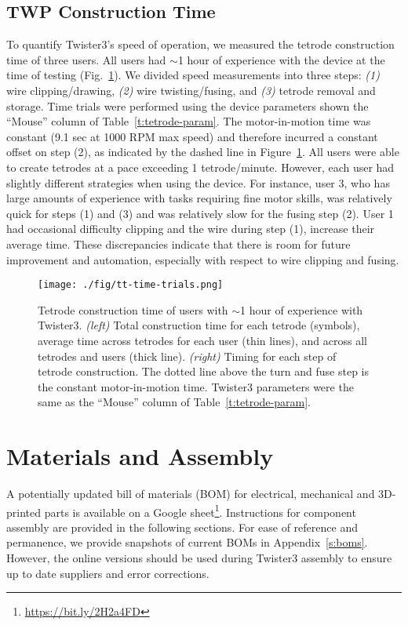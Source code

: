\documentclass[11pt,a4paper]{article}
\begin{document}
\subsection{TWP Construction Time}
To quantify Twister3's speed of operation, we measured the tetrode construction
time of three users. All users had $\sim$1 hour of experience with the device
at the time of testing (Fig.~\ref{f:tt-time}). We divided speed measurements
into three steps: \textit{(1)} wire clipping/drawing, \textit{(2)} wire
twisting/fusing, and \textit{(3)} tetrode removal and storage.  Time trials
were performed using the device parameters shown the ``Mouse'' column of
Table~\ref{t:tetrode-param}. The motor-in-motion time was constant (9.1 sec at
1000 RPM max speed) and therefore incurred a constant offset on step (2), as
indicated by the dashed line in Figure~\ref{f:tt-time}. All users were able to
create tetrodes at a pace exceeding 1 tetrode/minute. However, each user had
slightly different strategies when using the device. For instance, user 3, who
has large amounts of experience with tasks requiring fine motor skills, was
relatively quick for steps (1) and (3) and was relatively slow for the fusing
step (2).  User 1 had occasional difficulty clipping and the wire during step
(1), increase their average time. These discrepancies indicate that there is
room for future improvement and automation, especially with respect to wire
clipping and fusing.

\begin{figure}
\centering
\texttt{[image: ./fig/tt-time-trials.png]}
\caption{
    Tetrode construction time of users with $\sim$1 hour of experience with
    Twister3. \textit{(left)} Total construction time for each tetrode
    (symbols), average time across tetrodes for each user (thin lines), and across all tetrodes and users (thick
    line). \textit{(right)} Timing for each step of tetrode construction.
    The dotted line above the turn and fuse step is the constant motor-in-motion
    time. Twister3 parameters were the same as the ``Mouse'' column of
    Table~\ref{t:tetrode-param}.
}
\label{f:tt-time}
\end{figure}

\section{Materials and Assembly}
A potentially updated bill of materials (BOM) for electrical, mechanical and
3D-printed parts is available on a Google
sheet\footnote{\url{https://bit.ly/2H2a4FD}}. Instructions for component assembly are
provided in the following sections. For ease of reference and permanence, we
provide snapshots of current BOMs in Appendix~\ref{s:boms}. However, the online
versions should be used during Twister3 assembly to ensure up to date suppliers
and error corrections.
\end{document}
